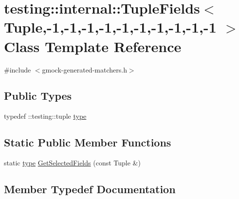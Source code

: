 \hypertarget{classtesting_1_1internal_1_1_tuple_fields_3_01_tuple_00-1_00-1_00-1_00-1_00-1_00-1_00-1_00-1_00-1_00-1_01_4}{}\section{testing\+:\+:internal\+:\+:Tuple\+Fields$<$ Tuple,-\/1,-\/1,-\/1,-\/1,-\/1,-\/1,-\/1,-\/1,-\/1,-\/1 $>$ Class Template Reference}
\label{classtesting_1_1internal_1_1_tuple_fields_3_01_tuple_00-1_00-1_00-1_00-1_00-1_00-1_00-1_00-1_00-1_00-1_01_4}


{\ttfamily \#include $<$gmock-\/generated-\/matchers.\+h$>$}

\subsection*{Public Types}
\begin{DoxyCompactItemize}
\item 
typedef \+::testing\+::tuple \hyperlink{classtesting_1_1internal_1_1_tuple_fields_3_01_tuple_00-1_00-1_00-1_00-1_00-1_00-1_00-1_00-1_00-1_00-1_01_4_addfc4b7d727aa8e4c7838a378a573bf6}{type}
\end{DoxyCompactItemize}
\subsection*{Static Public Member Functions}
\begin{DoxyCompactItemize}
\item 
static \hyperlink{classtesting_1_1internal_1_1_tuple_fields_3_01_tuple_00-1_00-1_00-1_00-1_00-1_00-1_00-1_00-1_00-1_00-1_01_4_addfc4b7d727aa8e4c7838a378a573bf6}{type} \hyperlink{classtesting_1_1internal_1_1_tuple_fields_3_01_tuple_00-1_00-1_00-1_00-1_00-1_00-1_00-1_00-1_00-1_00-1_01_4_a903907f35d09b8b0f4e4e2778c1350f7}{Get\+Selected\+Fields} (const Tuple \&)
\end{DoxyCompactItemize}


\subsection{Member Typedef Documentation}

